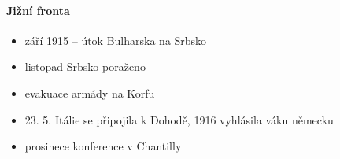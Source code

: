 \paragraph{Jižní fronta}
\begin{itemize}
\item září 1915 -- útok Bulharska na Srbsko
\item listopad Srbsko poraženo
\item evakuace armády na Korfu
\item 23. 5. Itálie se připojila k Dohodě, 1916 vyhlásila váku německu
\item prosinece konference v Chantilly
\end{itemize}

































